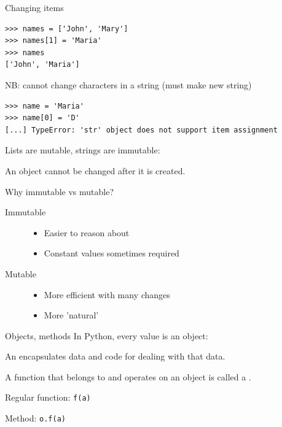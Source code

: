 \documentclass[aspectratio=169,usenames,dvipsnames]{beamer}
\begin{document}
\begin{frame}[fragile]{Changing items}
\begin{lstlisting} 
>>> names = ['John', 'Mary']
>>> names[1] = 'Maria'
>>> names
['John', 'Maria']
\end{lstlisting} 

\pause
NB: cannot change characters in a string (must make new string)
\begin{lstlisting} 
>>> name = 'Maria'
>>> name[0] = 'D'
[...] TypeError: 'str' object does not support item assignment
\end{lstlisting}

Lists are mutable, strings are immutable:
\begin{definition}
An  object cannot be changed after it is created.
\end{definition}
\end{frame}

\begin{frame}{Why immutable vs mutable?}
    \begin{description}
        \item[Immutable]
            \begin{itemize}
                \item Easier to reason about
                \item Constant values sometimes required
            \end{itemize}

        \item[Mutable]
            \begin{itemize}
                \item More efficient with many changes
                \item More 'natural'
            \end{itemize}
    \end{description}
\end{frame}

\begin{frame}{Objects, methods}
    In Python, every value is an object:

    \begin{definition}
        An  encapsulates
        data and code for dealing with that data.

        A function that belongs to and operates on an object
        is called a .
    \end{definition}
    
    Regular function: \texttt{f(a)}

    Method: \texttt{o.f(a)}
\end{frame}
\end{document}

